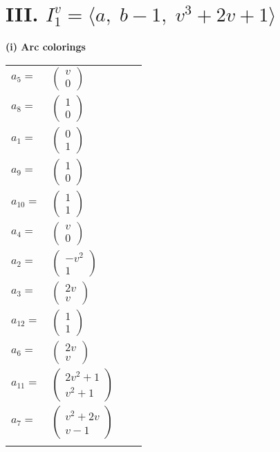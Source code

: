 \documentclass[1p]{elsarticle_modified}
\theoremstyle{definition}
\begin{document}
\centering \section*{III. $I^v_{1}= \langle a,\;b-1,\;v^3+2 v+1 \rangle$}
\flushleft \textbf{(i) Arc colorings}\\
\begin{tabular}{m{7pt} m{180pt} m{7pt} m{180pt} }
\flushright $a_{5}=$&$\begin{pmatrix}v\\0\end{pmatrix}$ \\
\flushright $a_{8}=$&$\begin{pmatrix}1\\0\end{pmatrix}$ \\
\flushright $a_{1}=$&$\begin{pmatrix}0\\1\end{pmatrix}$ \\
\flushright $a_{9}=$&$\begin{pmatrix}1\\0\end{pmatrix}$ \\
\flushright $a_{10}=$&$\begin{pmatrix}1\\1\end{pmatrix}$ \\
\flushright $a_{4}=$&$\begin{pmatrix}v\\0\end{pmatrix}$ \\
\flushright $a_{2}=$&$\begin{pmatrix}- v^2\\1\end{pmatrix}$ \\
\flushright $a_{3}=$&$\begin{pmatrix}2 v\\v\end{pmatrix}$ \\
\flushright $a_{12}=$&$\begin{pmatrix}1\\1\end{pmatrix}$ \\
\flushright $a_{6}=$&$\begin{pmatrix}2 v\\v\end{pmatrix}$ \\
\flushright $a_{11}=$&$\begin{pmatrix}2 v^2+1\\v^2+1\end{pmatrix}$ \\
\flushright $a_{7}=$&$\begin{pmatrix}v^2+2 v\\v-1\end{pmatrix}$\\&\end{tabular}
\end{document}
